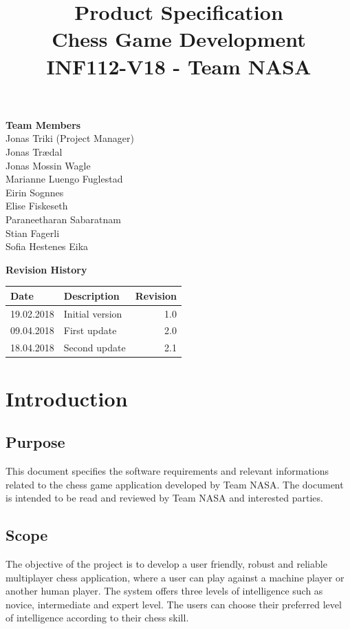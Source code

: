 \documentclass{article}
\title{Product Specification\\
		Chess Game Development\\
		INF112-V18 - Team NASA}
\author{}
\date{}
\begin{document}
\maketitle
	
\begin{center}
	\textbf{Team Members}\\
	Jonas Triki (Project Manager)\\
	Jonas Trædal\\	
	Jonas Mossin Wagle \\
	Marianne Luengo Fuglestad \\
	Eirin Sognnes\\
	Elise Fiskeseth\\
	Paraneetharan Sabaratnam\\
	Stian Fagerli\\
	Sofia Hestenes Eika\\	
\end{center}

\vspace{20mm}	

\begin{center}
	\textbf{Revision History}\\
	\begin{tabular}[b!]{|l|l|r|}
		\hline
		Date\hspace{2cm} & Description\hspace{5cm} & Revision \\
		\hline
		19.02.2018 & Initial version & 1.0 \\
		\hline
		09.04.2018 & First update & 2.0 \\
		\hline
		18.04.2018 & Second update & 2.1 \\
		\hline
	\end{tabular}
\end{center}

\newpage
\tableofcontents
\newpage

\section{Introduction}
\subsection{Purpose}
	This document specifies the software requirements and relevant informations related to the chess game application developed by Team NASA. The document is intended to be read and reviewed by Team NASA and interested parties.
\subsection{Scope}
	The objective of the project is to develop a user friendly, robust and reliable multiplayer chess application, where a user can play against a machine player or another human player. The system offers three levels of intelligence such as novice, intermediate and expert level. The users can choose their preferred level of intelligence according to their chess skill.
	\vspace{3mm}
	
\end{document}
